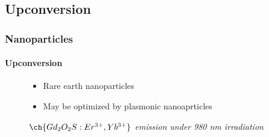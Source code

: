 \documentclass[aspectratio=169,fleqn,table]{beamer}
\begin{document}
\subsection{Upconversion}
\begingroup
{}
\begin{frame}
\frametitle{Nanoparticles}
\framesubtitle{Upconversion}

\begin{figure}
\centering
\begin{minipage}[border=15pt]{0.45\textwidth}
  	\centering
  	\vspace{-180pt}
  	\begin{itemize}
  	\begin{uc}
  		\textbf{Low energy photons conversion process, tipically in the near-infrared, to higher energy photons at the UV-VIS region}
  	\end{uc}
  		\item
  		Rare earth nanoparticles
		\item
		May be optimized by plasmonic nanoaprticles
  	\end{itemize}
\end{minipage}
\hfill
\begin{minipage}[b]{0.45\textwidth}
	\centering
	\vspace{-40pt}
	\caption{%
	\textit{$\ch{Gd_2O_2S:Er^{3+},Yb^{3+}}$ emission under 980 nm irradiation}}
\end{minipage}
\end{figure}

\end{frame}
\endgroup
\end{document}
